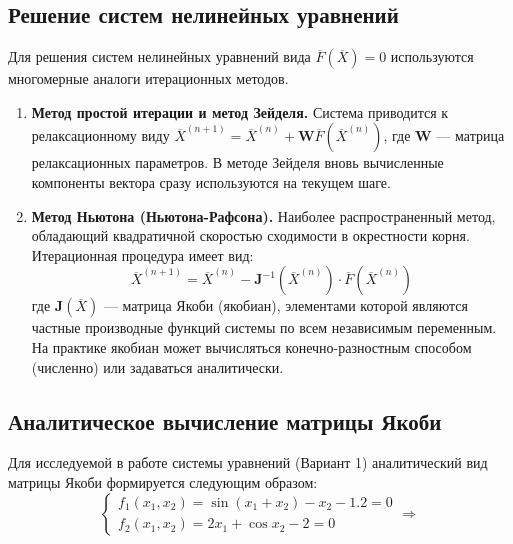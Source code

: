 \documentclass[a4paper]{article}
\begin{document}
\subsection{Решение систем нелинейных уравнений}
Для решения систем нелинейных уравнений вида $\overline{F}(\overline{X}) = 0$ используются многомерные аналоги итерационных методов.
\begin{enumerate}
    \item \textbf{Метод простой итерации и метод Зейделя.} Система приводится к релаксационному виду $\overline{X}^{(n+1)} = \overline{X}^{(n)} + \mathbf{W}\overline{F}(\overline{X}^{(n)})$, где $\mathbf{W}$ — матрица релаксационных параметров. В методе Зейделя вновь вычисленные компоненты вектора сразу используются на текущем шаге.
    \item \textbf{Метод Ньютона (Ньютона-Рафсона).} Наиболее распространенный метод, обладающий квадратичной скоростью сходимости в окрестности корня. Итерационная процедура имеет вид:
    \begin{equation}
        \overline{X}^{(n+1)} = \overline{X}^{(n)} - \mathbf{J}^{-1}(\overline{X}^{(n)}) \cdot \overline{F}(\overline{X}^{(n)})
    \end{equation}
    где $\mathbf{J}(\overline{X})$ — матрица Якоби (якобиан), элементами которой являются частные производные функций системы по всем независимым переменным. На практике якобиан может вычисляться конечно-разностным способом (численно) или задаваться аналитически.
\end{enumerate}

\subsection{Аналитическое вычисление матрицы Якоби}
Для исследуемой в работе системы уравнений (Вариант 1) аналитический вид матрицы Якоби формируется следующим образом:
\begin{equation}
\begin{cases}
f_1(x_1, x_2) = \sin(x_1 + x_2) - x_2 - 1.2 = 0 \\
f_2(x_1, x_2) = 2x_1 + \cos x_2 - 2 = 0
\end{cases}
\Rightarrow
\end{equation}
\end{document}
